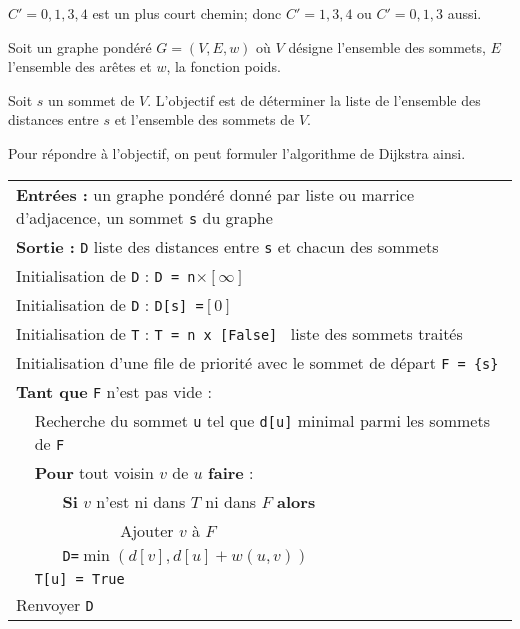 \begin{exemple}
$C' = 0, 1,3,4$ est un plus court chemin; donc $C' = 1,3,4$ ou $C' = 0, 1,3$ aussi. 
\end{exemple}

\begin{obj}
Soit un graphe pondéré $G=\left(V, E, w\right)$ où $V$ désigne l'ensemble des sommets, $E$ l'ensemble des arêtes et 
$w$, la fonction poids.

Soit $s$ un sommet de $V$. L'objectif est de déterminer la liste de l'ensemble des distances entre $s$ et l'ensemble des sommets de $V$.
\end{obj}


Pour répondre à l'objectif, on peut formuler l'algorithme de Dijkstra ainsi. 


\begin{center}
\begin{tabular}{|p{1cm}p{1cm}p{1cm}p{10cm}}
\multicolumn{4}{|p{15cm}}{\textbf{Entrées : }  un graphe pondéré donné par liste ou marrice d'adjacence, un sommet \texttt{s} du graphe}\\
\multicolumn{4}{|p{15cm}}{\textbf{Sortie : } \texttt{D} liste des distances entre \texttt{s} et chacun des sommets}\\
\multicolumn{4}{|p{15cm}}{Initialisation de \texttt{D} : \texttt{D = n}$\times [\infty]$ }\\
\multicolumn{4}{|p{15cm}}{Initialisation de \texttt{D} : \texttt{D[s] =}$[0]$ }\\
\multicolumn{4}{|p{15cm}}{Initialisation de \texttt{T} : \texttt{T = n x [False] } liste des sommets traités }\\
\multicolumn{4}{|p{15cm}}{Initialisation d'une file de priorité avec le sommet de départ \texttt{F = \{s\}}}\\
\multicolumn{4}{|p{15cm}}{\textbf{Tant que} \texttt{F} n'est pas vide :  }\\
& \multicolumn{3}{|p{15cm}}{Recherche du sommet \texttt{u} tel que \texttt{d[u]} minimal parmi les sommets de \texttt{F}}\\
& \multicolumn{3}{|p{15cm}}{\textbf{Pour} tout voisin $v$ de $u$ \textbf{faire} :}\\
&& \multicolumn{2}{|p{15cm}}{\textbf{Si} $v$ n'est ni dans $T$ ni dans $F$ \textbf{alors}}\\
&&& \multicolumn{1}{|p{15cm}}{Ajouter $v$ à $F$}\\
&& \multicolumn{2}{|p{15cm}}{\texttt{D=}$\min \left(d[v],d[u]+w(u,v)\right)$}\\
& \multicolumn{3}{|p{15cm}}{\texttt{T[u] =  True}}\\
\multicolumn{4}{|p{15cm}}{Renvoyer \texttt{D}}\\
\end{tabular}
\end{center}

